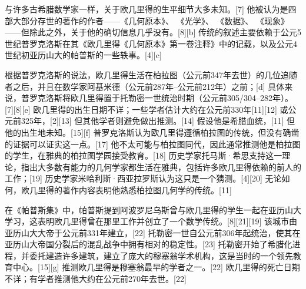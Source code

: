 与许多古希腊数学家一样，关于欧几里得的生平细节大多未知。[7] 他被认为是四部大部分存世的著作的作者——《几何原本》、 《光学》、 《数据》、 《现象》——但除此之外，关于他的确切信息几乎没有。[8][b] 传统的叙述主要依赖于公元5世纪普罗克洛斯在其《欧几里得《几何原本》第一卷注释》中的记载，以及公元4世纪初亚历山大的帕普斯的一些轶事。[4][c]

根据普罗克洛斯的说法，欧几里得生活在柏拉图（公元前347年去世）的几位追随者之后，并且在数学家阿基米德（公元前287年–公元前212年）之前；[d] 具体来说，普罗克洛斯将欧几里得置于托勒密一世统治时期（公元前305/304–282年）。[7][8][e] 欧几里得的出生日期不详；一些学者估计大约在公元前330年[11][12] 或公元前325年，[2][13] 但其他学者则避免做出推测。[14] 假设他是希腊血统，[11] 但他的出生地未知。[15][f] 普罗克洛斯认为欧几里得遵循柏拉图的传统，但没有确凿的证据可以证实这一点。[17] 他不太可能与柏拉图同代，因此通常推测他是柏拉图的学生，在雅典的柏拉图学园接受教育。[18] 历史学家托马斯·希思支持这一理论，指出大多数有能力的几何学家都生活在雅典，包括许多欧几里得依赖的前人的工作；[19] 历史学家米哈利斯·西亚拉罗斯认为这只是一个猜测。[4][20] 无论如何，欧几里得的著作内容表明他熟悉柏拉图几何学的传统。[11]

在《帕普斯集》中，帕普斯提到阿波罗尼乌斯曾与欧几里得的学生一起在亚历山大学习，这表明欧几里得曾在那里工作并创立了一个数学传统。[8][21][19] 该城市由亚历山大大帝于公元前331年建立，[22] 托勒密一世自公元前306年起统治，使其在亚历山大帝国分裂后的混乱战争中拥有相对的稳定性。[23] 托勒密开始了希腊化进程，并委托建造许多建筑，建立了庞大的穆塞翁学术机构，这是当时的一个领先教育中心。[15][g] 推测欧几里得是穆塞翁最早的学者之一。[22] 欧几里得的死亡日期不详；有学者推测他大约在公元前270年去世。[22]
